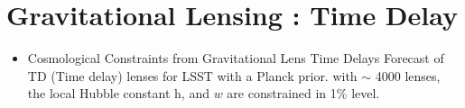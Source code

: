 \section{Gravitational Lensing : Time Delay}
\begin{itemize}
\item Cosmological Constraints from Gravitational Lens Time Delays
\citep[][coe09a]{coe09a}
Forecast of TD (Time delay) lenses for LSST with a Planck prior.
with $\sim$ 4000 lenses, the local Hubble constant h, \omegal
and $w$ are constrained in 1\% level.
\end{itemize}
